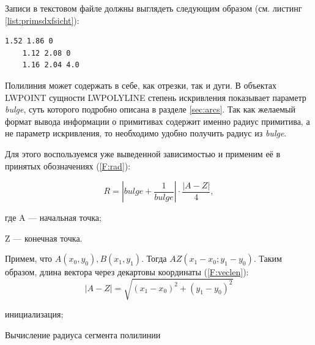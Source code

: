Записи в текстовом файле должны выглядеть следующим образом (см. листинг \ref{list:primsdxfsicht}):

\begin{lstlisting}[caption={Пример содержания TXT-файла (x, y, r)},label=list:primsdxfsicht]
	1.52 1.86 0
	1.12 2.08 0
	1.16 2.04 4.0
\end{lstlisting}

Полилиния может содержать в себе, как отрезки, так и дуги. В объектах LWPOINT сущности LWPOLYLINE степень искривления показывает параметр \textit{bulge}, суть которого подробно описана в разделе \ref{sec:arcs}. Так как желаемый формат вывода информации о примитивах содержит именно радиус примитива, а не параметр искривления, то необходимо удобно получить радиус из \textit{bulge}.

Для этого воспользуемся уже выведенной зависимостью \cite{ukoloff} и применим её в принятых обозначениях (\ref{F:rad}):

\begin{equation}
	R=|bulge+\frac{1}{bulge}|\cdot\frac{|A-Z|}{4},
	\label{F:rad}
\end{equation}

где A --- начальная точка;

Z --- конечная точка.

Примем, что $A(x_0,y_0), B(x_1,y_1)$. Тогда $AZ(x_1-x_0; y_1-y_0)$.
Таким образом, длина вектора через декартовы координаты (\ref{F:veclen}):
\begin{equation}
	|A-Z|=\sqrt{(x_1-x_0)^2+(y_1-y_0)^2}
	\label{F:veclen}
\end{equation}


\begin{algorithm}[H]
	\SetAlgoLined
	инициализация;
	
	
	\caption{Вычисление радиуса сегмента полилинии}
	\label{alg:polyarcrad}
\end{algorithm}

